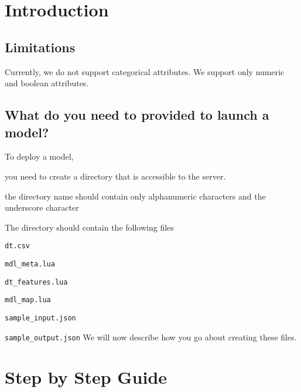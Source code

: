 
\section{Introduction}
\TBC

\subsection{Limitations}

\be
\item 
Currently, we do not support categorical attributes. 
We support only numeric and boolean attributes. 
\ee

\subsection{What do you need to provided to launch a model?}

To deploy a model, 
\be
\item you need to create a directory that is accessible to the server. 
\item the directory name should contain only alphanumeric characters 
and the underscore character
\item The directory should contain the following files
\be
\item \verb+dt.csv   +
\item \verb+mdl_meta.lua  +
\item \verb+dt_features.lua  +
\item \verb+mdl_map.lua   +
\item \verb+sample_input.json   +
\item \verb+sample_output.json+
\ee
\ee
We will now describe how you go about creating these files.

\section{Step by Step Guide}

